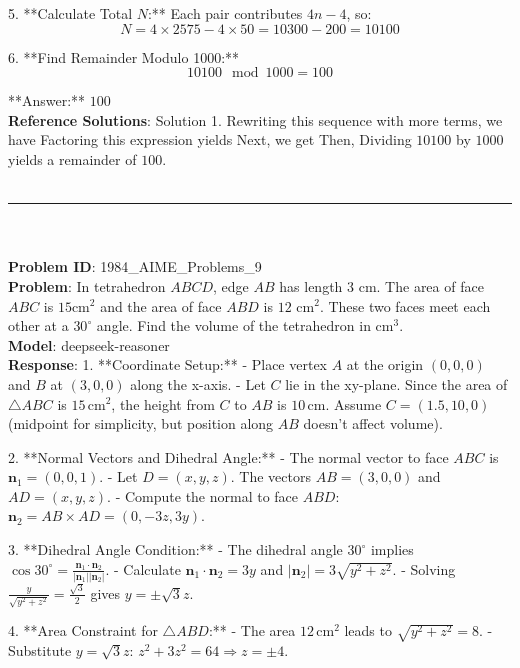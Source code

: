 {5. **Calculate Total \( N \):**
   Each pair contributes \( 4n - 4 \), so:
   \[
   N = 4 \times 2575 - 4 \times 50 = 10300 - 200 = 10100
   \]

6. **Find Remainder Modulo 1000:**
   \[
   10100 \mod 1000 = 100
   \]

**Answer:** \(\boxed{100}\) \\
    \textbf{Reference Solutions}: Solution 1. Rewriting this sequence with more terms, we have
Factoring this expression yields
Next, we get
Then,
Dividing $10100$ by $1000$ yields a remainder of $\boxed{100}$. \\
    \vspace{0.3cm} \\
    \hrule \\
    \vspace{0.5cm} \\
    \textbf{Problem ID}: 1984_AIME_Problems_9 \\
    \textbf{Problem}: In tetrahedron $ABCD$, edge $AB$ has length 3 cm. The area of face $ABC$ is $15\mbox{cm}^2$ and the area of face $ABD$ is $12 \mbox { cm}^2$. These two faces meet each other at a $30^\circ$ angle. Find the volume of the tetrahedron in $\mbox{cm}^3$. \\
    \textbf{Model}: deepseek-reasoner \\
    \textbf{Response}: 1. **Coordinate Setup:**
   - Place vertex \( A \) at the origin \((0,0,0)\) and \( B \) at \((3,0,0)\) along the x-axis.
   - Let \( C \) lie in the xy-plane. Since the area of \( \triangle ABC \) is \(15 \, \text{cm}^2\), the height from \( C \) to \( AB \) is \(10 \, \text{cm}\). Assume \( C = (1.5, 10, 0) \) (midpoint for simplicity, but position along \( AB \) doesn’t affect volume).

2. **Normal Vectors and Dihedral Angle:**
   - The normal vector to face \( ABC \) is \( \mathbf{n}_1 = (0,0,1) \).
   - Let \( D = (x, y, z) \). The vectors \( AB = (3,0,0) \) and \( AD = (x,y,z) \).
   - Compute the normal to face \( ABD \): \( \mathbf{n}_2 = AB \times AD = (0, -3z, 3y) \).

3. **Dihedral Angle Condition:**
   - The dihedral angle \( 30^\circ \) implies \( \cos 30^\circ = \frac{\mathbf{n}_1 \cdot \mathbf{n}_2}{|\mathbf{n}_1||\mathbf{n}_2|} \).
   - Calculate \( \mathbf{n}_1 \cdot \mathbf{n}_2 = 3y \) and \( |\mathbf{n}_2| = 3\sqrt{y^2 + z^2} \).
   - Solving \( \frac{y}{\sqrt{y^2 + z^2}} = \frac{\sqrt{3}}{2} \) gives \( y = \pm\sqrt{3}z \).

4. **Area Constraint for \( \triangle ABD \):**
   - The area \(12 \, \text{cm}^2\) leads to \( \sqrt{y^2 + z^2} = 8 \).
   - Substitute \( y = \sqrt{3}z \): \( z^2 + 3z^2 = 64 \Rightarrow z = \pm4 \).

}
